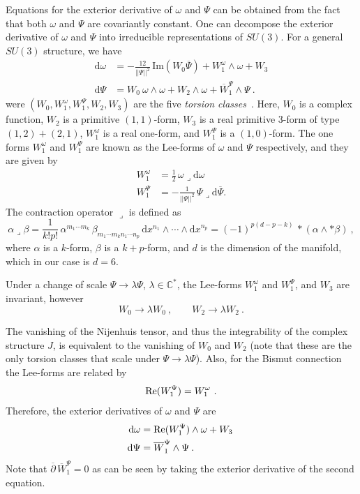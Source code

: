 \documentclass[12pt,a4paper]{article}
\newcommand{\IC}{\mathbb{C}}
\def\bar#1{\overline{#1}}
\def\to{\rightarrow}
\def\d{\textrm{d}}
\theoremstyle{definition}
\begin{document}
Equations for the exterior derivative of $\omega$ and $\Psi$ can be obtained from the fact that both $\omega$ and $\Psi$ are covariantly constant.  One can decompose the exterior derivative of $\omega$ and $\Psi$ into irreducible representations of $SU(3)$.
For a general $SU(3)$ structure,   we have 
\begin{align*}
\d\omega&=-\frac{12}{\vert\vert\Psi\vert\vert^2}\,\textrm{Im}(W_0\bar\Psi)+W_1^\omega\wedge\omega+W_3\\
\d\Psi&=W_0\ \omega\wedge\omega+W_2\wedge\omega+\bar W_1^\Psi\wedge\Psi\:.
\end{align*}
were $(W_0, W _1^\omega,W_1^\Psi,W_2,W_3)$ are the five {\it torsion classes}~\citep{0444.53032, 1024.53018, LopesCardoso:2002hd, Gauntlett:2003cy}.
Here, $W_0$ is a complex function, $W_2$ is a primitive $(1,1)$-form, $W_3$ is  a real primitive 3-form of type $(1,2)+(2,1)$, $W_1^\omega$ is a real one-form, and $W_1^\Psi$ is a $(1,0)$-form. 
The one forms $W_1^\omega$ and $W_1^\Psi$ are known as the Lee-forms of $\omega$ and $\Psi$ respectively, and they are given by
\begin{align*}
W_1^\omega&=\frac{1}{2}\, \omega\lrcorner\d\omega\\
W_1^\Psi&=- \frac{1}{\vert\vert\Psi\vert\vert^2}\,\Psi\lrcorner\d\bar\Psi.
\end{align*}
The contraction operator $\lrcorner$ is defined as 
\[ \alpha\lrcorner \beta = \frac{1}{k! p!}\, \alpha^{m_1\cdots m_k}\, \beta_{m_1\cdots m_k n_1\cdots n_p}\,
\d x^{n_1}\wedge\cdots\wedge \d x^{n_p}
= (-1)^{p(d-p-k)}\,* (\alpha\wedge *\beta)~,\]
where $\alpha$ is a $k$-form, $\beta$ is a $k+p$-form, and $d$ is the dimension of the manifold, which in our case is $d=6$.

Under a change of scale $\Psi\rightarrow\lambda\Psi$, $\lambda\in\IC^*$, the Lee-forms $W_1^\omega$ and $W_1^{\Psi}$, and $W_3$ are invariant, however
$$W_0\longrightarrow\lambda W_0~,\qquad W_2\longrightarrow\lambda W_2~.$$

The vanishing of the Nijenhuis tensor, and thus the integrability of the complex structure $J$, is equivalent to the vanishing of $W_0$ and $W_2$ (note that these are the only torsion classes that scale under $\Psi\to\lambda\Psi$).
Also, for the Bismut connection the Lee-forms are related by~\citep{LopesCardoso:2002hd}
\[   {\rm Re}(W_1^\Psi) =  W_1^\omega~.\]
Therefore, the exterior derivatives of $\omega$ and $\Psi$ are
\begin{align*}
\d\omega&= {\rm Re}(W_1^\Psi)\wedge\omega+W_3\:\\
\d\Psi&=\bar W_1^\Psi\wedge\Psi\:.
\end{align*}
Note that $\bar\partial\, \bar W_1^\Psi = 0$ as can be seen by taking the exterior derivative of the second equation. 
\end{document}
